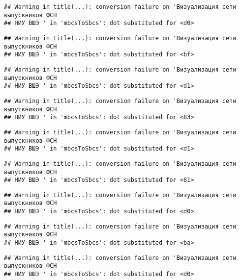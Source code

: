 \documentclass[
]{article}
\begin{document}
\begin{verbatim}
## Warning in title(...): conversion failure on 'Визуализация сети выпускников ФСН
## НИУ ВШЭ ' in 'mbcsToSbcs': dot substituted for <d0>
\end{verbatim}

\begin{verbatim}
## Warning in title(...): conversion failure on 'Визуализация сети выпускников ФСН
## НИУ ВШЭ ' in 'mbcsToSbcs': dot substituted for <bf>
\end{verbatim}

\begin{verbatim}
## Warning in title(...): conversion failure on 'Визуализация сети выпускников ФСН
## НИУ ВШЭ ' in 'mbcsToSbcs': dot substituted for <d1>
\end{verbatim}

\begin{verbatim}
## Warning in title(...): conversion failure on 'Визуализация сети выпускников ФСН
## НИУ ВШЭ ' in 'mbcsToSbcs': dot substituted for <83>
\end{verbatim}

\begin{verbatim}
## Warning in title(...): conversion failure on 'Визуализация сети выпускников ФСН
## НИУ ВШЭ ' in 'mbcsToSbcs': dot substituted for <d1>
\end{verbatim}

\begin{verbatim}
## Warning in title(...): conversion failure on 'Визуализация сети выпускников ФСН
## НИУ ВШЭ ' in 'mbcsToSbcs': dot substituted for <81>
\end{verbatim}

\begin{verbatim}
## Warning in title(...): conversion failure on 'Визуализация сети выпускников ФСН
## НИУ ВШЭ ' in 'mbcsToSbcs': dot substituted for <d0>
\end{verbatim}

\begin{verbatim}
## Warning in title(...): conversion failure on 'Визуализация сети выпускников ФСН
## НИУ ВШЭ ' in 'mbcsToSbcs': dot substituted for <ba>
\end{verbatim}

\begin{verbatim}
## Warning in title(...): conversion failure on 'Визуализация сети выпускников ФСН
## НИУ ВШЭ ' in 'mbcsToSbcs': dot substituted for <d0>
\end{verbatim}
\end{document}
